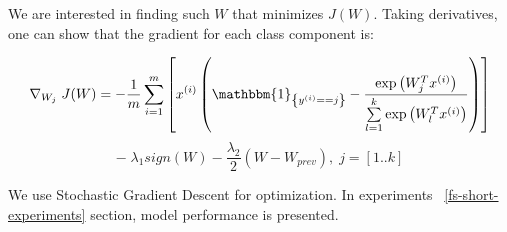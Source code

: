 We are interested in finding such $W$ that minimizes $J(W)$. Taking derivatives, one can show that the gradient for each class component is:

\begin{center}

$$ \nabla_{W_j} \; J(W) = -\frac{1}{m} \sum \limits_{i = 1}^{m} \left[ x^{(i)} \left( \mathbbm{1}_{\left\{y^{(i)} == j\right\} } - \frac{\exp\left({W_{j}^Tx^{(i)}}\right)}{\sum \limits_{l = 1}^{k}  \exp\left({W_{l}^Tx^{(i)}}\right)} \right) \right] $$
$$ - \; \lambda_1 sign\left(W\right) - \frac{\lambda_2}{2} \left(W - W_{prev} \right), \; j = [1..k] $$

\end{center} 

We use Stochastic Gradient Descent for optimization. In experiments ~\ref{fs-short-experiments} section, model performance is presented.